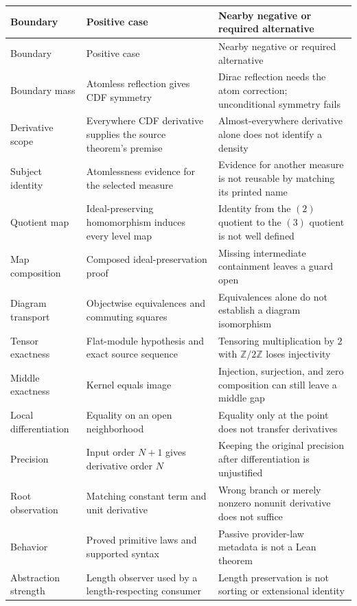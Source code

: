 \documentclass[11pt,a4paper]{article}
\newcommand{\Z}{\mathbb Z}\newcommand{\N}{\mathbb N}
\theoremstyle{plain}
\theoremstyle{definition}
\theoremstyle{remark}
\begin{document}
{\small
\begin{longtable}{@{}P{29mm}P{52mm}P{64mm}@{}}
\toprule
Boundary & Positive case & Nearby negative or required alternative\\
\midrule\endfirsthead
\toprule Boundary & Positive case & Nearby negative or required alternative\\\midrule\endhead
\bottomrule\endfoot
Boundary mass & Atomless reflection gives CDF symmetry & Dirac reflection needs the atom correction; unconditional symmetry fails\\
Derivative scope & Everywhere CDF derivative supplies the source theorem's premise & Almost-everywhere derivative alone does not identify a density\\
Subject identity & Atomlessness evidence for the selected measure & Evidence for another measure is not reusable by matching its printed name\\
Quotient map & Ideal-preserving homomorphism induces every level map & Identity from the $(2)$ quotient to the $(3)$ quotient is not well defined\\
Map composition & Composed ideal-preservation proof & Missing intermediate containment leaves a guard open\\
Diagram transport & Objectwise equivalences and commuting squares & Equivalences alone do not establish a diagram isomorphism\\
Tensor exactness & Flat-module hypothesis and exact source sequence & Tensoring multiplication by $2$ with $\Z/2\Z$ loses injectivity\\
Middle exactness & Kernel equals image & Injection, surjection, and zero composition can still leave a middle gap\\
Local differentiation & Equality on an open neighborhood & Equality only at the point does not transfer derivatives\\
Precision & Input order $N+1$ gives derivative order $N$ & Keeping the original precision after differentiation is unjustified\\
Root observation & Matching constant term and unit derivative & Wrong branch or merely nonzero nonunit derivative does not suffice\\
Behavior & Proved primitive laws and supported syntax & Passive provider-law metadata is not a Lean theorem\\
Abstraction strength & Length observer used by a length-respecting consumer & Length preservation is not sorting or extensional identity\\

\end{longtable}}
\end{document}
